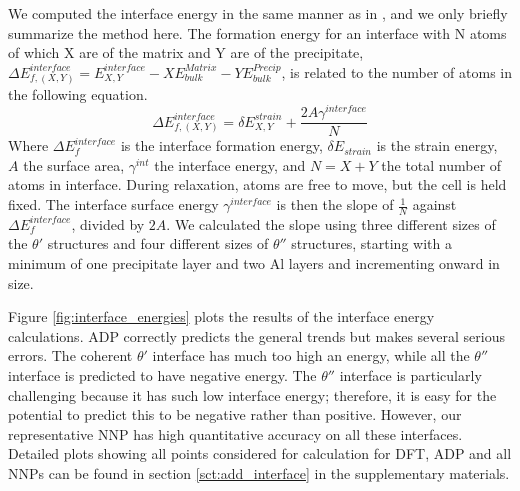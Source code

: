 \documentclass{article}
\begin{document}
We computed the interface energy in the same manner as in \cite{Vaithyanathan2004MultiscaleAlloys}, and we only briefly summarize the method here.
The formation energy for an interface with N atoms of which X are of the matrix and Y are of the precipitate,
$\Delta E^{interface}_{f, (X,Y)} = E^{interface}_{X,Y}-XE^{Matrix}_{bulk}-YE^{Precip}_{bulk}$,
is related to the number of atoms in the following equation. 
\begin{equation}
\Delta E^{interface}_{f,(X,Y)} = \delta E^{strain}_{X,Y} + \frac{2A\gamma^{interface}}{N}
\end{equation}
Where $\Delta E^{interface}_f$ is the interface formation energy, $\delta E_{strain}$ is the strain energy, $A$ the surface area,
$\gamma^{int}$ the interface energy, and $N=X+Y$ the total number of atoms in interface.
During relaxation, atoms are free to move, but the cell is held fixed.
The interface surface energy $\gamma^{interface}$ is then the slope of $\frac{1}{N}$ against
$\Delta E^{interface}_f$, divided by $2A$.
We calculated the slope using three different sizes of the $\theta'$ structures and four different sizes of $\theta''$ structures, starting with a minimum of one precipitate layer and two Al layers and incrementing onward in size. 




Figure \ref{fig:interface_energies} plots the results of the interface energy calculations.
ADP correctly predicts the general trends but makes several serious errors.
The coherent $\theta'$ interface has much too high an energy, while all the $\theta''$ interface is predicted to have negative energy.
The $\theta''$ interface is particularly challenging because it has such low interface energy; therefore, it is easy for the potential to predict this to be negative rather than positive.
However, our representative NNP has high quantitative accuracy on all these interfaces.
Detailed plots showing all points considered for calculation for DFT, ADP and all NNPs can be found in section \ref{sct:add_interface} in the supplementary materials.
\end{document}
